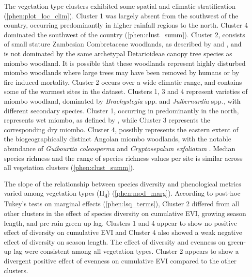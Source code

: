 \begin{refsection}
The \numberstringnum{\nCluster} vegetation type clusters exhibited some spatial and climatic stratification (\autoref{phen:plot_loc_clim}). Cluster 1 was largely absent from the southwest of the country, occurring predominantly in higher rainfall regions to the north. Cluster 4 dominated the southwest of the country (\autoref{phen:clust_summ}). Cluster 2, consists of small stature Zambesian Combretaceae woodlands, as described by \citet{Dinerstein2017} and \citet{Chidumayo2001}, and is not dominated by the same archetypal Detarioideae canopy tree species as miombo woodland. It is possible that these woodlands represent highly disturbed miombo woodlands where large trees may have been removed by humans or by fire induced mortality. Cluster 2 occurs over a wide climatic range, and contains some of the warmest sites in the dataset. Clusters 1, 3 and 4 represent varieties of miombo woodland, dominated by \textit{Brachystegia} spp. and \textit{Julbernardia} spp., with different secondary species. Cluster 1, occurring in predominantly in the north, represents wet miombo, as defined by \citet{White1983}, while Cluster 3 represents the corresponding dry miombo. Cluster 4, possibly represents the eastern extent of the biogeographically distinct Angolan miombo woodlands, with the notable abundance of \textit{Guibourtia coleosperma} and \textit{Cryptosepalum exfoliatum} \citep{Huntley1994}. Median species richness and the range of species richness values per site is similar across all vegetation clusters (\autoref{phen:clust_summ}). 

The slope of the relationship between species diversity and phenological metrics varied among vegetation types (H\textsubscript{4}) (\autoref{phen:mod_marg}). According to post-hoc Tukey's tests on marginal effects (\autoref{phen:lsq_terms}), Cluster 2 differed from all other clusters in the effect of species diversity on cumulative EVI, growing season length, and pre-rain green-up lag. Clusters 1 and 4 appear to show no positive effect of diversity on cumulative EVI and Cluster 4 also showed a weak negative effect of diversity on season length. The effect of diversity and evenness on green-up lag were consistent among all vegetation types. Cluster 2 appears to show a divergent positive effect of evenness on cumulative EVI compared to the other clusters. 
 

\end{refsection}
